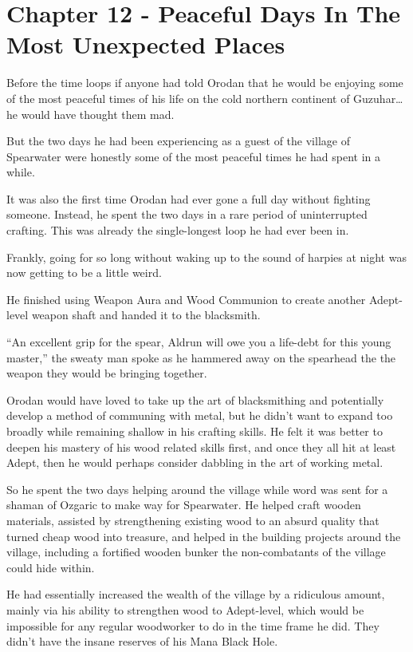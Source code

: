 \documentclass[a4paper,10pt]{book}
\begin{document}
\section*{Chapter 12 - Peaceful Days In The Most Unexpected Places}
%
\par
Before the time loops if anyone had told Orodan that he would be enjoying some of the most peaceful times of his life on the cold northern continent of Guzuhar… he would have thought them mad.\par
But the two days he had been experiencing as a guest of the village of Spearwater were honestly some of the most peaceful times he had spent in a while.\par
It was also the first time Orodan had ever gone a full day without fighting someone. Instead, he spent the two days in a rare period of uninterrupted crafting. This was already the single-longest loop he had ever been in.\par
Frankly, going for so long without waking up to the sound of harpies at night was now getting to be a little weird.\par
He finished using Weapon Aura and Wood Communion to create another Adept-level weapon shaft and handed it to the blacksmith.\par
“An excellent grip for the spear, Aldrun will owe you a life-debt for this young master,” the sweaty man spoke as he hammered away on the spearhead the the weapon they would be bringing together.\par
Orodan would have loved to take up the art of blacksmithing and potentially develop a method of communing with metal, but he didn’t want to expand too broadly while remaining shallow in his crafting skills. He felt it was better to deepen his mastery of his wood related skills first, and once they all hit at least Adept, then he would perhaps consider dabbling in the art of working metal.\par
So he spent the two days helping around the village while word was sent for a shaman of Ozgaric to make way for Spearwater. He helped craft wooden materials, assisted by strengthening existing wood to an absurd quality that turned cheap wood into treasure, and helped in the building projects around the village, including a fortified wooden bunker the non-combatants of the village could hide within.\par
He had essentially increased the wealth of the village by a ridiculous amount, mainly via his ability to strengthen wood to Adept-level, which would be impossible for any regular woodworker to do in the time frame he did. They didn’t have the insane reserves of his Mana Black Hole.\par
\end{document}
